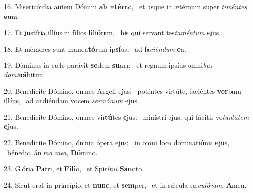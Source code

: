 16. Misericórdia autem Dómini \textbf{ab} æ\textbf{tér}no, \ast\  et usque in ætérnum super \textit{ti}\textit{mén}\textit{tes} \textbf{e}um.\

17. Et justítia illíus in fílios \textbf{fi}li\textbf{ó}rum, \ast\  his qui servant tes\textit{ta}\textit{mén}\textit{tum} \textbf{e}jus.\

18. Et mémores sunt manda\textbf{tó}rum ip\textbf{sí}us, \ast\  ad fa\textit{ci}\textit{én}\textit{dum} \textbf{e}a.\

19. Dóminus in cælo parávit \textbf{se}dem \textbf{su}am: \ast\  et regnum ipsíus ómni\textit{bus} \textit{do}\textit{mi}\textbf{ná}bitur.\

20. Benedícite Dómino, omnes Angeli ejus: \dag\  poténtes virtúte, faciéntes \textbf{ver}bum il\textbf{lí}us, \ast\  ad audiéndam vocem \textit{ser}\textit{mó}\textit{num} \textbf{e}jus.\

21. Benedícite Dómino, omnes vir\textbf{tú}tes \textbf{e}jus: \ast\  minístri ejus, qui fácitis vo\textit{lun}\textit{tá}\textit{tem} \textbf{e}jus.\

22. Benedícite Dómino, ómnia ópera ejus: \dag\  in omni loco dominati\textbf{ó}nis \textbf{e}jus, \ast\  bénedic, áni\textit{ma} \textit{me}\textit{a}, \textbf{Dó}mino.\

23. Glória \textbf{Pa}tri, et \textbf{Fí}\textbf{li}o, \ast\  et Spi\textit{rí}\textit{tu}\textit{i} \textbf{Sanc}to.\

24. Sicut erat in princípio, et \textbf{nunc}, et \textbf{sem}per, \ast\  et in sǽcula sæ\textit{cu}\textit{ló}\textit{rum}. \textbf{A}men.\

